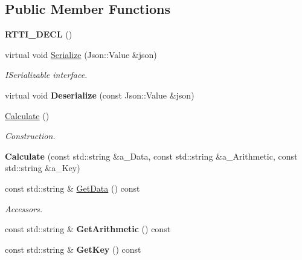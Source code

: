 \subsection*{Public Member Functions}
\begin{DoxyCompactItemize}
\item 
\mbox{\label{class_calculate_abf54cf9803fcf27231ddb4fc8de521fc}} 
{\bfseries R\+T\+T\+I\+\_\+\+D\+E\+CL} ()
\item 
\mbox{\label{class_calculate_a777e77f559b8c54ff730eb37fd2ae6a5}} 
virtual void \hyperlink{class_calculate_a777e77f559b8c54ff730eb37fd2ae6a5}{Serialize} (Json\+::\+Value \&json)
\begin{DoxyCompactList}\small\item\em I\+Serializable interface. \end{DoxyCompactList}\item 
\mbox{\label{class_calculate_a1a8f1974ec5b7b40fbc0dde839d2b1b5}} 
virtual void {\bfseries Deserialize} (const Json\+::\+Value \&json)
\item 
\mbox{\label{class_calculate_a9324cfcffaf7004813243ab39b003c66}} 
\hyperlink{class_calculate_a9324cfcffaf7004813243ab39b003c66}{Calculate} ()
\begin{DoxyCompactList}\small\item\em Construction. \end{DoxyCompactList}\item 
\mbox{\label{class_calculate_afb33778c92ef17d52f11471cbea5be75}} 
{\bfseries Calculate} (const std\+::string \&a\+\_\+\+Data, const std\+::string \&a\+\_\+\+Arithmetic, const std\+::string \&a\+\_\+\+Key)
\item 
\mbox{\label{class_calculate_a9f653444641c2b365a4c6722017f6293}} 
const std\+::string \& \hyperlink{class_calculate_a9f653444641c2b365a4c6722017f6293}{Get\+Data} () const
\begin{DoxyCompactList}\small\item\em Accessors. \end{DoxyCompactList}\item 
\mbox{\label{class_calculate_a1e1f0c9814392a129027be0a21cad11f}} 
const std\+::string \& {\bfseries Get\+Arithmetic} () const
\item 
\mbox{\label{class_calculate_a41dadfb963f4b2de5413c25dccc7cced}} 
const std\+::string \& {\bfseries Get\+Key} () const
\end{DoxyCompactItemize}

